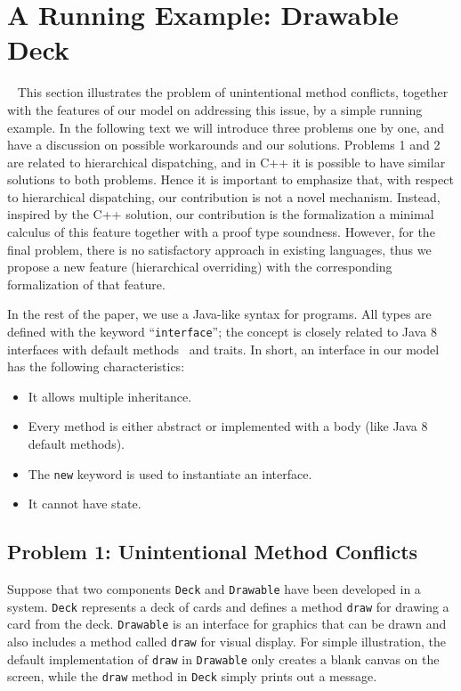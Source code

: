 \section{A Running Example: Drawable Deck}~\label{sec:overview}
This section illustrates the problem of unintentional method conflicts,
together with the features of our model on addressing this issue, by
a simple running example. In the following text we will introduce three
problems one by one, and have a discussion on possible workarounds and
our solutions.
Problems 1 and 2 are related to hierarchical dispatching, and in 
C++ it is possible to have similar solutions to both
problems. Hence it is important to emphasize that, with respect to
hierarchical dispatching, our contribution is not a novel
mechanism. Instead, 
inspired by the C++ solution, our contribution is the formalization a minimal calculus
of this feature together with a proof type soundness. However, for the final problem, there is no satisfactory approach
in existing languages, thus we propose a new feature (hierarchical
overriding) with the corresponding formalization of that feature.

In the rest of the paper, we use a Java-like syntax for programs. All types are defined with the keyword
``\lstinline|interface|''; the concept is closely related to Java 8
interfaces with default methods~\cite{bono14} and traits. In short, 
an interface in our model has the following characteristics:
\begin{itemize}
	\item It allows multiple inheritance.
	\item Every method is either abstract or implemented with a body (like Java 8 default methods). 
	\item The \lstinline|new| keyword is used to instantiate an interface.
	\item It cannot have state.
\end{itemize}


\subsection{Problem 1: Unintentional Method Conflicts}\label{subsec:problem1}
Suppose that two components \lstinline|Deck| and \lstinline|Drawable| 
have been developed in a system. \lstinline|Deck| represents a deck
of cards and defines a method \lstinline|draw| for drawing a card from the
deck.  \lstinline|Drawable| is an interface for graphics that
can be drawn and also includes a method called \lstinline|draw| for
visual display. For simple illustration, the default implementation of
\lstinline|draw| in \lstinline|Drawable| only creates a blank canvas
on the screen, while the \lstinline|draw| method in \lstinline|Deck| simply
prints out a message.

